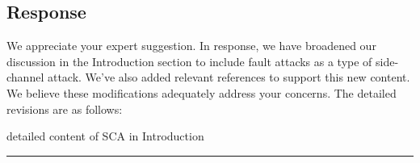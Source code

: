 \subsection{Response}

We appreciate your expert suggestion. In response, we have broadened our discussion in the Introduction section to include fault attacks as a type of side-channel attack. We've also added relevant references to support this new content. We believe these modifications adequately address your concerns. The detailed revisions are as follows:

\color{blue}

detailed content of SCA in Introduction



\color{black}


\noindent\rule{\linewidth}{6.0pt}